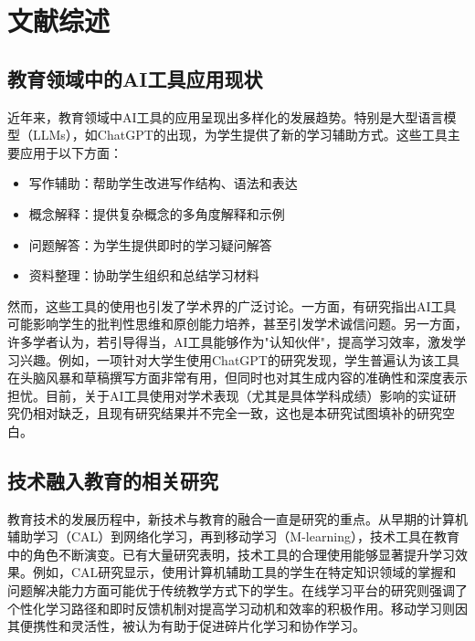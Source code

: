 \documentclass[a4paper,12pt]{article}
\begin{document}
\section{文献综述}
\subsection{教育领域中的AI工具应用现状}

近年来，教育领域中AI工具的应用呈现出多样化的发展趋势。特别是大型语言模型（LLMs），如ChatGPT的出现，为学生提供了新的学习辅助方式\citep{kasneci2023chatgpt}。这些工具主要应用于以下方面：

\begin{itemize}
    \item 写作辅助：帮助学生改进写作结构、语法和表达\citep{baidoo2023education}
    \item 概念解释：提供复杂概念的多角度解释和示例
    \item 问题解答：为学生提供即时的学习疑问解答\citep{rudolph2023chatgpt}
    \item 资料整理：协助学生组织和总结学习材料
\end{itemize}

然而，这些工具的使用也引发了学术界的广泛讨论。一方面，有研究指出AI工具可能影响学生的批判性思维和原创能力培养，甚至引发学术诚信问题\citep{openai2023gpt4}。另一方面，许多学者认为，若引导得当，AI工具能够作为"认知伙伴"，提高学习效率，激发学习兴趣\citep{hwang2020roles}。例如，一项针对大学生使用ChatGPT的研究发现，学生普遍认为该工具在头脑风暴和草稿撰写方面非常有用，但同时也对其生成内容的准确性和深度表示担忧\citep{farrokhnia2023integrating}。目前，关于AI工具使用对学术表现（尤其是具体学科成绩）影响的实证研究仍相对缺乏，且现有研究结果并不完全一致，这也是本研究试图填补的研究空白。

\subsection{技术融入教育的相关研究}

教育技术的发展历程中，新技术与教育的融合一直是研究的重点。从早期的计算机辅助学习（CAL）到网络化学习，再到移动学习（M-learning），技术工具在教育中的角色不断演变。已有大量研究表明，技术工具的合理使用能够显著提升学习效果\citep{schmid2014does}。例如，CAL研究显示，使用计算机辅助工具的学生在特定知识领域的掌握和问题解决能力方面可能优于传统教学方式下的学生\citep{kulik1994meta}。在线学习平台的研究则强调了个性化学习路径和即时反馈机制对提高学习动机和效率的积极作用\citep{means2013learning}。移动学习则因其便携性和灵活性，被认为有助于促进碎片化学习和协作学习\citep{crompton2013systematic}。
\end{document}
